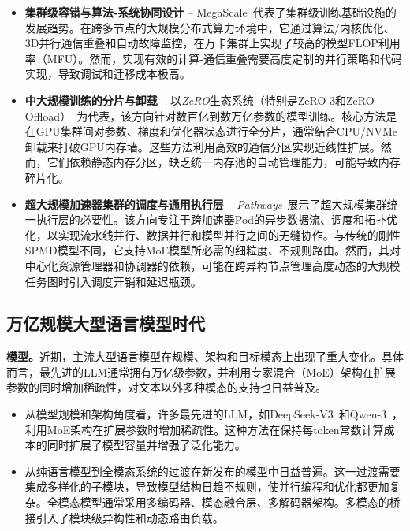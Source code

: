 \documentclass[11pt]{article}
\begin{document}
\begin{itemize}
    \item \textbf{集群级容错与算法-系统协同设计} -- {MegaScale}~\cite{jiang2024megascale}代表了集群级训练基础设施的发展趋势。在跨多节点的大规模分布式算力环境中，它通过算法/内核优化、3D并行通信重叠和自动故障监控，在万卡集群上实现了较高的模型FLOP利用率（MFU）。然而，实现有效的计算-通信重叠需要高度定制的并行策略和代码实现，导致调试和迁移成本极高。
    
    \item \textbf{中大规模训练的分片与卸载} -- 以\textit{ZeRO}生态系统（特别是ZeRO-3和ZeRO-Offload）~\cite{rajbhandari2020zero, ren2021zero}为代表，该方向针对数百亿到数万亿参数的模型训练。核心方法是在GPU集群间对参数、梯度和优化器状态进行全分片，通常结合CPU/NVMe卸载来打破GPU内存墙。这些方法利用高效的通信分区实现近线性扩展。然而，它们依赖静态内存分区，缺乏统一内存池的自动管理能力，可能导致内存碎片化。
    
    \item \textbf{超大规模加速器集群的调度与通用执行层} -- \textit{Pathways}~\cite{barham2022pathways}展示了超大规模集群统一执行层的必要性。该方向专注于跨加速器Pod的异步数据流、调度和拓扑优化，以实现流水线并行、数据并行和模型并行之间的无缝协作。与传统的刚性SPMD模型不同，它支持MoE模型所必需的细粒度、不规则路由。然而，其对中心化资源管理器和协调器的依赖，可能在跨异构节点管理高度动态的大规模任务图时引入调度开销和延迟瓶颈。
    
\end{itemize}

\subsection{万亿规模大型语言模型时代}

\noindent \textbf{模型。}近期，主流大型语言模型在规模、架构和目标模态上出现了重大变化。具体而言，最先进的LLM通常拥有万亿级参数，并利用专家混合（MoE）架构在扩展参数的同时增加稀疏性，对文本以外多种模态的支持也日益普及。

\begin{itemize}
    \item 从模型规模和架构角度看，许多最先进的LLM，如DeepSeek-V3~\cite{liu2024deepseek}和Qwen-3~\cite{yang2025qwen3}，利用MoE架构在扩展参数时增加稀疏性。这种方法在保持每token常数计算成本的同时扩展了模型容量并增强了泛化能力。
    \item 从纯语言模型到全模态系统的过渡在新发布的模型中日益普遍。这一过渡需要集成多样化的子模块，导致模型结构日趋不规则，使并行编程和优化都更加复杂。全模态模型通常采用多编码器、模态融合层、多解码器架构。多模态的桥接引入了模块级异构性和动态路由负载。
\end{itemize}
\end{document}

